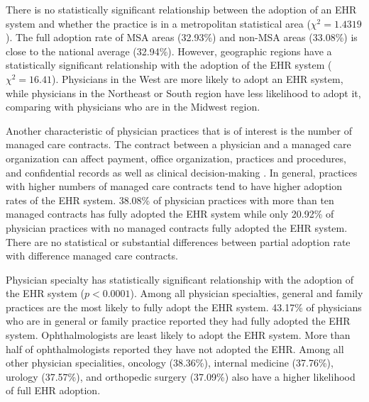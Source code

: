 \documentclass[12pt]{report}
\begin{document}
There is no statistically significant relationship between the adoption of an EHR system and whether the practice is in a metropolitan statistical area ($\chi^2=1.4319$). The full adoption rate of MSA areas (32.93\%) and non-MSA areas (33.08\%) is close to the national average (32.94\%). However, geographic regions have a statistically significant relationship with the adoption of the EHR system ($\chi^2=16.41$). Physicians in the West are more likely to adopt an EHR system, while physicians in the Northeast or South region have less likelihood to adopt it, comparing with physicians who are in the Midwest region.

Another characteristic of physician practices that is of interest is the number of managed care contracts. The contract between a physician and a managed care organization can affect payment, office organization, practices and procedures, and confidential records as well as clinical decision-making \citep{mcc2008}. In general, practices with higher numbers of managed care contracts tend to have higher adoption rates of the EHR system. 38.08\% of physician practices with more than ten managed contracts has fully adopted the EHR system while only 20.92\% of physician practices with no managed contracts fully adopted the EHR system. There are no statistical or substantial differences between partial adoption rate with difference managed care contracts.

Physician specialty has statistically significant relationship with the adoption of the EHR system ($p < 0.0001$). Among all physician specialties, general and family practices are the most likely to fully adopt the EHR system. 43.17\% of physicians who are in general or family practice reported they had fully adopted the EHR system. Ophthalmologists are least likely to adopt the EHR system. More than half of ophthalmologists reported they have not adopted the EHR. Among all other physician specialities, oncology (38.36\%), internal medicine (37.76\%), urology (37.57\%), and orthopedic surgery (37.09\%) also have a higher likelihood of full EHR adoption.
 
\end{document}
